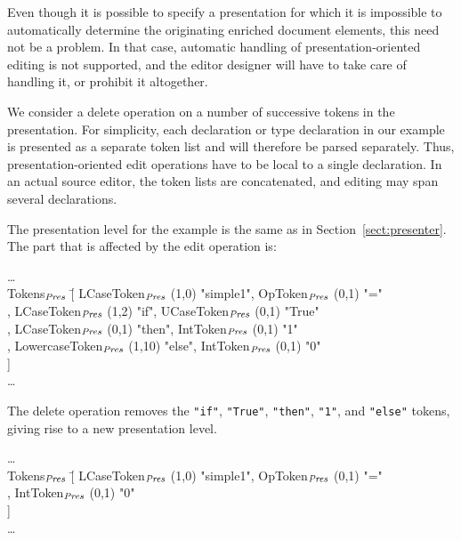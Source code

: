 \documentclass{speauth}
\begin{document}
\bc
Even though it is possible to specify a presentation for which it is impossible to automatically determine the originating enriched document elements, this need not be a problem. In that case, automatic handling of presentation-oriented editing is not supported, and the editor designer will have to take care of handling it, or prohibit it altogether. \ec

We consider a delete operation on a number of successive tokens in the presentation. For simplicity, each declaration or type declaration in our example is presented as a separate token list and will therefore be parsed separately. Thus, presentation-oriented edit operations have to be local to a single declaration. In an actual source editor, the token lists are concatenated, and editing may span several declarations.

The presentation level for the example is the same as in Section~\ref{sect:presenter}. The part that is affected by the edit operation is: 

\small \ttfamily
\begin{tabbing}
\dots\\
Tokens$_{\mathit{Pres}}$ \= [ LCaseToken$_{\mathit{Pres}}$ (1,0) "simple1", OpToken$_{\mathit{Pres}}$ (0,1) "="\\
                         \> , LCaseToken$_{\mathit{Pres}}$ (1,2) "if", UCaseToken$_{\mathit{Pres}}$ (0,1) "True"\\
                         \> , LCaseToken$_{\mathit{Pres}}$ (0,1) "then", IntToken$_{\mathit{Pres}}$ (0,1) "1"\\
                         \> , LowercaseToken$_{\mathit{Pres}}$ (1,10) "else", IntToken$_{\mathit{Pres}}$ (0,1) "0"\\
                         \> ]\\
\dots                                                  
\end{tabbing}
\rmfamily \normalsize

The delete operation removes the \verb|"if"|,  \verb|"True"|,  \verb|"then"|,  \verb|"1"|, and  \verb|"else"| tokens, giving rise to a new presentation level.

\small \ttfamily
\begin{tabbing}
\dots\\
Tokens$_{\mathit{Pres}}$ \= [ LCaseToken$_{\mathit{Pres}}$ (1,0) "simple1", OpToken$_{\mathit{Pres}}$ (0,1) "="\\
                         \> ,  IntToken$_{\mathit{Pres}}$ (0,1) "0"\\
                         \> ]\\
\dots                                                  
\end{tabbing}
\rmfamily \normalsize
\end{document}
